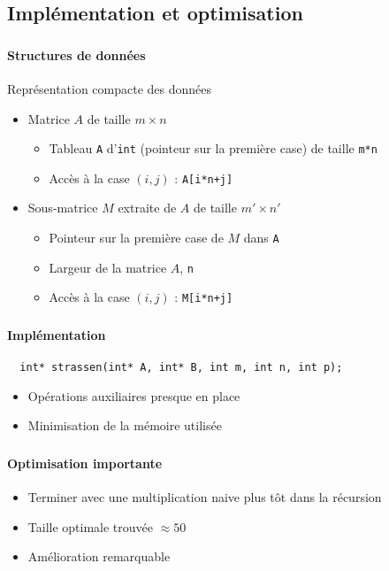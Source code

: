 \documentclass{beamer}
\begin{document}
\subsection{Implémentation et optimisation}
\begin{frame}[fragile]
  \frametitle{\insertsubsection}
  \framesubtitle{Structures de données}
  Représentation compacte des données
  \begin{itemize}
    \item<2-> Matrice $A$ de taille $m\times n$
    \begin{itemize}
      \item Tableau \verb=A= d'\verb=int=
      (pointeur sur la première case) de taille \verb=m*n=
      \item Accès à la case $(i,j)$ : \verb=A[i*n+j]=
    \end{itemize}
    \item<3-> Sous-matrice $M$ extraite de $A$ de taille $m'\times n'$
    \begin{itemize}
      \item Pointeur sur la première case de $M$ dans \verb=A=
      \item Largeur de la matrice $A$, \verb=n=
      \item Accès à la case $(i,j)$ : \verb=M[i*n+j]=
    \end{itemize}
  \end{itemize}
\end{frame}

\begin{frame}[fragile]
  \frametitle{\insertsubsection}
  \framesubtitle{Implémentation}
  \small\begin{verbatim}
  int* strassen(int* A, int* B, int m, int n, int p);
  \end{verbatim}\normalsize

  \begin{itemize}
    \item Opérations auxiliaires presque en place
    \item Minimisation de la mémoire utilisée
  \end{itemize}
\end{frame}

\begin{frame}
  \frametitle{\insertsubsection}
  \framesubtitle{Optimisation importante}
  \begin{itemize}
    \item
    Terminer avec une multiplication naive plus tôt dans la récursion
    \item Taille optimale trouvée $\approx 50$
    \item Amélioration remarquable
  \end{itemize}
\end{frame}
\end{document}

